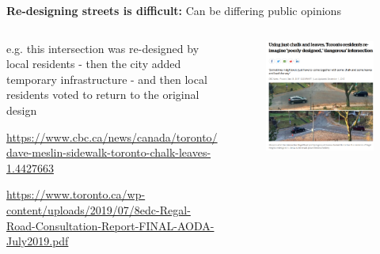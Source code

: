 \documentclass[aspectratio=169]{beamer}
\begin{document}
\begin{frame}
	
	\textbf{Re-designing streets is difficult:} Can be differing public opinions
	
	\vspace{2mm}
	
	
	
		
	
	\begin{columns}
		\begin{column}{0.35\textwidth}
			
			e.g. this intersection was re-designed by local residents - then the city added temporary infrastructure - and then local residents voted to return to the original design
			
			\vspace{2mm}
			
			\tiny\url{https://www.cbc.ca/news/canada/toronto/dave-meslin-sidewalk-toronto-chalk-leaves-1.4427663}
			
			\vspace{2mm}
			
			\tiny\url{https://www.toronto.ca/wp-content/uploads/2019/07/8edc-Regal-Road-Consultation-Report-FINAL-AODA-July2019.pdf}
			
			
			
		\end{column}
		
		\begin{column}{0.65\textwidth}
			\begin{figure}
				\centering
				\includegraphics[width=0.9\linewidth]{images/leaves_road.png}
			\end{figure}
			
			
			
		\end{column}
		
		
		
	\end{columns}
	
	
\end{frame}
\end{document}

